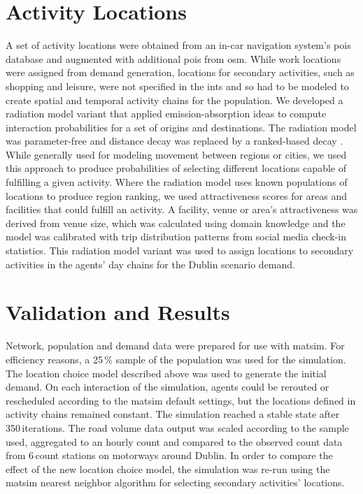 \section{Activity Locations}
A set of activity locations were obtained from an in-car navigation system’s \glspl{poi} database and augmented with additional \glspl{poi} from \gls{osm}. While work locations were assigned from demand generation, locations for secondary activities, such as shopping and leisure, were not specified in the \gls{ints} and so had to be modeled to create spatial and temporal activity chains for the population. We developed a radiation model variant that applied emission-absorption ideas to compute interaction probabilities for a set of origins and destinations. The radiation model was parameter-free and distance decay was replaced by a ranked-based decay \citep[][]{SiminiEtAl_NAT_2012}. While generally used for modeling movement between regions or cities, we used this approach to produce probabilities of selecting different locations capable of fulfilling a given activity. Where the radiation model uses known populations of locations to produce region ranking, we used attractiveness scores for areas and facilities that could fulfill an activity. A facility, venue or area's attractiveness was derived from venue size, which was calculated using domain knowledge and the model was calibrated with trip distribution patterns from social media check-in statistics. This radiation model variant was used to assign locations to secondary activities in the agents’ day chains for the Dublin scenario demand.

\section{Validation and Results}
Network, population and demand data were prepared for use with \gls{matsim}. For efficiency reasons, a 25\,\% sample of the population was used for the simulation. The location choice model described above was used to generate the initial demand. On each interaction of the simulation, agents could be rerouted or rescheduled according to the \gls{matsim} default settings, but the locations defined in activity chains remained constant. The simulation reached a stable state after 350\,iterations. The road volume data output was scaled according to the sample used, aggregated to an hourly count and compared to the observed count data from 6\,count stations on motorways around Dublin. In order to compare the effect of the new location choice model, the simulation was re-run using the \gls{matsim} nearest neighbor algorithm for selecting secondary activities' locations.

